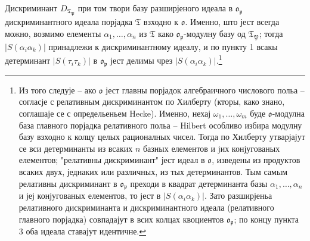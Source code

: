 \documentclass[11pt]{article}
\newcommand{\mo}{\mathfrak{o}}
\newcommand{\mT}{\mathfrak{T}}
\newcommand{\mP}{\mathfrak{P}}
\newcommand{\mpideal}{\mathfrak{p}}
\begin{document}
\setcounter{footnote}{38}

\noindent Дискриминант $D_{\mT_\mP}$ при том твори базу разширјеного идеала в $\mo_\mpideal$ дискриминантного идеала порјадка $\mT$ взходно к $\mo$. Именно, што јест всегда можно, возмимо елементы $\alpha_1,\ldots,\alpha_n$ из $\mT$ како $\mo_\mpideal$-модулну базу од $\mT_\mP$; тогда $|S(\alpha_i\alpha_k)|$ принадлежи к дискриминантному идеалу, и по пункту 1 всакы детерминант $|S(\tau_i\tau_k)|$ в $\mo_\mpideal$ јест делимы чрез $|S(\alpha_i\alpha_k)|$.\footnote{Из того следује -- ако $\mo$ јест главны порјадок алгебраичного числового польа -- согласје с релативным дискриминантом по Хилберту (кторы, како знано, соглашаје се с определьеньем Hecke). Именно, нехај $\omega_1,\ldots,\omega_m$ буде $\mo$-модулна база главного порјадка релативного польа -- Hilbert особливо избира модулну базу взходно к колцу целых рационалных чисел. Тогда по Хилберту утварјајут се вси детерминанты из всаких $n$ базных елементов и јих конјугованых елементов; "релативны дискриминант" јест идеал в $\mo$, изведены из продуктов всаких двух, једнаких или различных, из тых детерминантов. Тым самым релативны дискриминант в $\mo_\mpideal$ преходи в квадрат детерминанта базы $\alpha_1,\ldots,\alpha_n$ и јеј конјугованых елементов, то јест в $|S(\alpha_i\alpha_k)|$. Зато разширјеньа релативного дискриминанта и дискриминантного идеала (релативного главного порјадка) совпадајут в всих колцах квоциентов $\mo_\mpideal$; по концу пункта 3 оба идеала ставајут идентичне.}
\end{document}
